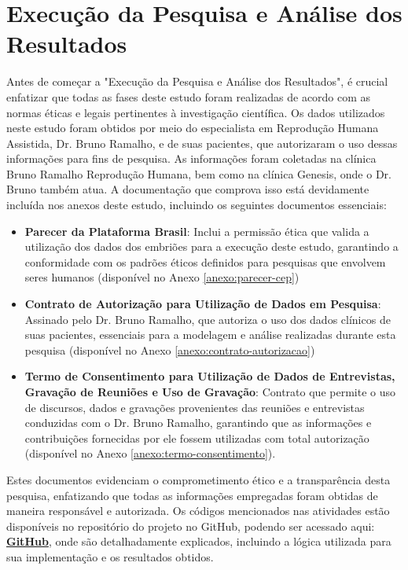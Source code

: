 
\chapter[Execução da Pesquisa e Análise dos Resultados]{Execução da Pesquisa e Análise dos Resultados} 

Antes de começar a "Execução da Pesquisa e Análise dos Resultados", é crucial enfatizar que todas as fases deste estudo foram realizadas de acordo com as normas éticas e legais pertinentes à investigação científica. Os dados utilizados neste estudo foram obtidos por meio do especialista em Reprodução Humana Assistida, Dr. Bruno Ramalho, e de suas pacientes, que autorizaram o uso dessas informações para fins de pesquisa. As informações foram coletadas na clínica Bruno Ramalho Reprodução Humana, bem como na clínica Genesis, onde o Dr. Bruno também atua. A documentação que comprova isso está devidamente incluída nos anexos deste estudo, incluindo os seguintes documentos essenciais:
\begin{itemize}
  \item \textbf{Parecer da Plataforma Brasil}: Inclui a permissão ética que valida a utilização dos dados dos embriões para a execução deste estudo, garantindo a conformidade com os padrões éticos definidos para pesquisas que envolvem seres humanos (disponível no Anexo \ref{anexo:parecer-cep})
  \item \textbf{Contrato de Autorização para Utilização de Dados em Pesquisa}: Assinado pelo Dr. Bruno Ramalho, que autoriza o uso dos dados clínicos de suas pacientes, essenciais para a modelagem e análise realizadas durante esta pesquisa (disponível no Anexo \ref{anexo:contrato-autorizacao})
  \item \textbf{Termo de Consentimento para Utilização de Dados de Entrevistas, Gravação de Reuniões e Uso de Gravação}: Contrato que permite o uso de discursos, dados e gravações provenientes das reuniões e entrevistas conduzidas com o Dr. Bruno Ramalho, garantindo que as informações e contribuições fornecidas por ele fossem utilizadas com total autorização (disponível no Anexo \ref{anexo:termo-consentimento}).
\end{itemize}
Estes documentos evidenciam o comprometimento ético e a transparência desta pesquisa, enfatizando que todas as informações empregadas foram obtidas de maneira responsável e autorizada.
Os códigos mencionados nas atividades estão disponíveis no repositório do projeto no GitHub, podendo ser acessado aqui: \textbf{\href{https://github.com/CedisUnB/TCC-MedicinaReprodutiva}{GitHub}}, onde são detalhadamente explicados, incluindo a lógica utilizada para sua implementação e os resultados obtidos.
 
